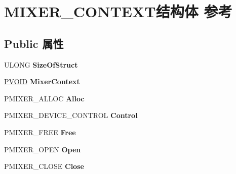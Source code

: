 \hypertarget{struct_m_i_x_e_r___c_o_n_t_e_x_t}{}\section{M\+I\+X\+E\+R\+\_\+\+C\+O\+N\+T\+E\+X\+T结构体 参考}
\label{struct_m_i_x_e_r___c_o_n_t_e_x_t}
\subsection*{Public 属性}
\begin{DoxyCompactItemize}
\item 
\mbox{\label{struct_m_i_x_e_r___c_o_n_t_e_x_t_a388d33725090e0861f3e9b1e3858a3db}} 
U\+L\+O\+NG {\bfseries Size\+Of\+Struct}
\item 
\mbox{\label{struct_m_i_x_e_r___c_o_n_t_e_x_t_a7453c64696bc5b4b8e10cc9d7d149e4c}} 
\hyperlink{interfacevoid}{P\+V\+O\+ID} {\bfseries Mixer\+Context}
\item 
\mbox{\label{struct_m_i_x_e_r___c_o_n_t_e_x_t_ac8002e4c72363381c179a96fc577346d}} 
P\+M\+I\+X\+E\+R\+\_\+\+A\+L\+L\+OC {\bfseries Alloc}
\item 
\mbox{\label{struct_m_i_x_e_r___c_o_n_t_e_x_t_a1edb5bb0641c51e8365a9eee2ad3b68d}} 
P\+M\+I\+X\+E\+R\+\_\+\+D\+E\+V\+I\+C\+E\+\_\+\+C\+O\+N\+T\+R\+OL {\bfseries Control}
\item 
\mbox{\label{struct_m_i_x_e_r___c_o_n_t_e_x_t_aad7444e8ac6a6fb0a5e299d796d6d754}} 
P\+M\+I\+X\+E\+R\+\_\+\+F\+R\+EE {\bfseries Free}
\item 
\mbox{\label{struct_m_i_x_e_r___c_o_n_t_e_x_t_a9a4e429a0060d4913eab058b49751cf5}} 
P\+M\+I\+X\+E\+R\+\_\+\+O\+P\+EN {\bfseries Open}
\item 
\mbox{\label{struct_m_i_x_e_r___c_o_n_t_e_x_t_a30391e47ceb800f53f411a867bb5c436}} 
P\+M\+I\+X\+E\+R\+\_\+\+C\+L\+O\+SE {\bfseries Close}
\item 
\mbox{\label{struct_m_i_x_e_r___c_o_n_t_e_x_t_a62bf13a46297c6b0f5a2ca2aac76ef65}} 

\end{DoxyCompactItemize}
